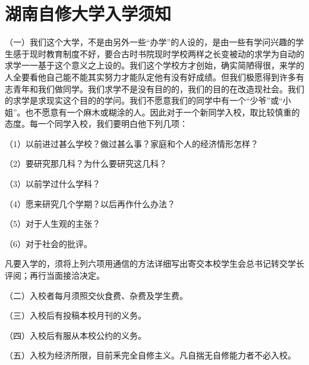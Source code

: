 \section{湖南自修大学入学须知}


（一）我们这个大学，不是由另外一些“办学”的人设的，是由一些有学问兴趣的学生感于现时教育制度不好，要合古时书院现时学校两样之长变被动的求学为自动的求学一一基于这个意义之上设的。我们这个学校方才创始，确实简陋得很，来学的人全要看他自己能不能其实努力才能队定他有没有好成绩。但我们极愿得到许多有志青年和我们做同学。我们求学不是没有目的的，我们的目的在改造现社会。我们的求学是求现实这个目的的学问。我们不愿意我们的同学中有一个“少爷”或“小姐”。也不愿意有一个麻木或糊涂的人。因此对于一个新同学入校，取比较慎重的态度。每一个同学入校，我们要明白他下列几项：

（1）以前进过甚么学校？做过甚么事？家庭和个人的经济情形怎样？

（2）要研究那几科？为什么要研究这几科？

（3）以前学过什么学科？

（4）愿来研究几个学期？以后再作什么办法？

（5）对于人生观的主张？

（6）对于社会的批评。

凡要入学的，须将上列六项用通信的方法详细写出寄交本校学生会总书记转交学长评阅；再行当面接洽决定。

（二）入校者每月须照交伙食费、杂费及学生费。

（三）入校后有投稿本校月刊的义务。

（四）入校后有服从本校公约的义务。

（五）入校为经济所限，目前釆完全自修主义。凡自揣无自修能力者不必入校。

